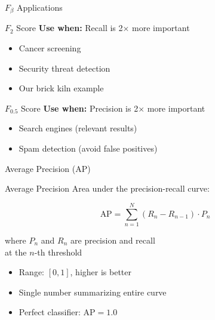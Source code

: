 \documentclass{beamer}
\begin{document}
\begin{frame}{$F_\beta$ Applications}
\begin{examplebox}{$F_2$ Score}
\textbf{Use when:} Recall is 2× more important

\begin{itemize}
    \item Cancer screening
    \item Security threat detection
    \item Our brick kiln example
\end{itemize}
\end{examplebox}

\vspace{0.3cm}

\begin{examplebox}{$F_{0.5}$ Score}
\textbf{Use when:} Precision is 2× more important

\begin{itemize}
    \item Search engines (relevant results)
    \item Spam detection (avoid false positives)
\end{itemize}
\end{examplebox}
\end{frame}

\begin{frame}{Average Precision (AP)}
\begin{definitionbox}{Average Precision}
Area under the precision-recall curve:

$$\text{AP} = \sum_{n=1}^{N} (R_n - R_{n-1}) \cdot P_n$$

where $P_n$ and $R_n$ are precision and recall \\
at the $n$-th threshold
\end{definitionbox}

\vspace{0.3cm}

\begin{itemize}
    \item Range: $[0, 1]$, higher is better
    \item Single number summarizing entire curve
    \item Perfect classifier: $\text{AP} = 1.0$
\end{itemize}
\end{frame}
\end{document}
